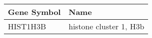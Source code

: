 \begin{tabular}{ll}
\toprule
Gene Symbol &                   Name \\
\midrule
   HIST1H3B & histone cluster 1, H3b \\
\bottomrule
\end{tabular}
